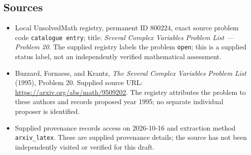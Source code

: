 \documentclass[11pt]{article}
\begin{document}
\subsection{Sources}
\begin{itemize}
\item Local UnsolvedMath registry, permanent ID \(800224\), exact source problem code \texttt{catalogue entry}; title: \emph{Several Complex Variables Problem List --- Problem 20}. The supplied registry labels the problem \texttt{open}; this is a supplied status label, not an independently verified mathematical assessment.
\item Buzzard, Fornaess, and Krantz, \emph{The Several Complex Variables Problem List} (1995), Problem 20. Supplied source URL: \url{https://arxiv.org/abs/math/9509202}. The registry attributes the problem to these authors and records proposed year 1995; no separate individual proposer is identified.
\item Supplied provenance records access on 2026-10-16 and extraction method \texttt{arxiv\_latex}. These are supplied provenance details; the source has not been independently visited or verified for this draft.
\end{itemize}
\end{document}
